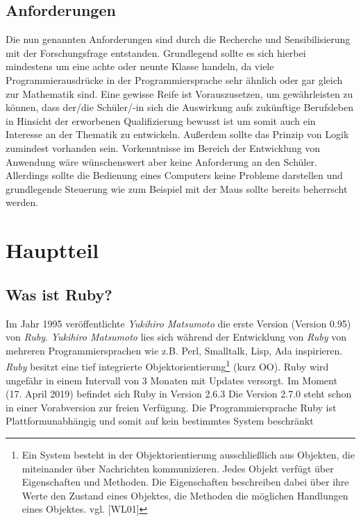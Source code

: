 \documentclass[12pt,DIV=14, version=first, BCOR=10mm,a4paper,twoside,parskip=half-,headsepline,headinclude]{scrartcl}
\begin{document}
\subsection{Anforderungen}
\begin{flushleft}
Die nun genannten Anforderungen sind durch die Recherche und Sensibilisierung mit der Forschungsfrage entstanden. Grundlegend sollte es sich hierbei mindestens um eine achte oder neunte Klasse handeln, da viele Programmierausdrücke in der Programmiersprache sehr ähnlich oder gar gleich zur Mathematik sind. Eine gewisse Reife ist Vorauszusetzen, um gewährleisten zu können, dass der/die Schüler/-in sich die Auswirkung aufs zukünftige Berufsleben in Hinsicht der erworbenen Qualifizierung bewusst ist um somit auch ein Interesse an der Thematik zu entwickeln. Außerdem sollte das Prinzip von Logik zumindest vorhanden sein. Vorkenntnisse im Bereich der Entwicklung von Anwendung wäre wünschenswert aber keine Anforderung an den Schüler. Allerdings sollte die Bedienung eines Computers keine Probleme darstellen und grundlegende Steuerung wie zum Beispiel mit der Maus sollte bereits beherrscht werden.
\end{flushleft}

\section{Hauptteil}

\subsection{Was ist Ruby?} \label{Was ist Ruby?}
\begin{flushleft}
Im Jahr 1995 veröffentlichte \textit{Yukihiro Matsumoto} die erste Version (Version 0.95) von \textit{\glqq Ruby\grqq}. \textit{Yukihiro Matsumoto} lies sich während der Entwicklung von \textit{\glqq Ruby\grqq} von mehreren Programmiersprachen wie z.B. Perl, Smalltalk, Lisp, Ada inspirieren. \textit{Ruby} besitzt eine tief integrierte
Objektorientierung\footnote{\label{foot:1} Ein System besteht in der Objektorientierung ausschließlich aus Objekten, die miteinander über Nachrichten kommunizieren. Jedes Objekt verfügt über Eigenschaften und Methoden. Die Eigenschaften beschreiben dabei über ihre Werte den Zustand eines Objektes, die Methoden die möglichen Handlungen eines Objektes. vgl. [WL01]} (kurz OO). Ruby wird ungefähr in einem Intervall von 3 Monaten mit Updates versorgt. Im Moment (17. April 2019) befindet sich Ruby in Version 2.6.3 Die Version 2.7.0 steht schon in einer Vorabversion zur freien Verfügung. Die Programmiersprache Ruby ist Plattformunabhängig und somit auf kein bestimmtes System beschränkt
\end{flushleft}
\end{document}
